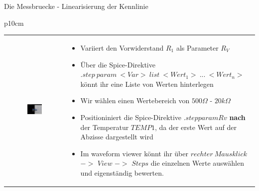 \begin{frame}[t]{Die Messbruecke - Linearisierung der Kennlinie}
\begin{spacing}{0.9}
\begin{tiny}
\begin{table}[h!]
\begin{tabular}{p{10cm} }
\begin{tabular}{p{5cm} p{5cm}}
\begin{minipage}{0.5\textwidth}
                            \begin{figure}
                                \centering
                                \includegraphics[width=0.95\linewidth]{pictures/mb_kty81_steps.png}
                            \end{figure}
                        \end{minipage}
                         &
                        \begin{minipage}{0.5\textwidth}
                            \begin{itemize}
                                \item Variiert den Vorwiderstand $R_1$ als Parameter $R_V$
                                \item Über die Spice-Direktive $.step\ param\ <Var>\ list\ <Wert_1>\ ...\ <Wert_n>$ könnt ihr eine Liste von Werten hinterlegen
                                \item Wir wählen einen Wertebereich von $500\Omega$ - $20k\Omega$
                                \item Positioniniert die Spice-Direktive $.step param Rv$ \textbf{nach} der Temperatur $TEMP1$, da der erste Wert auf der Abzisse dargestellt wird
                                \item Im waveform viewer könnt ihr über $rechter\ Mausklick$ $->$ $View$ $->$ $Steps$ die einzelnen Werte auswählen und eigenständig bewerten.
                            \end{itemize}
                        \end{minipage}
                    \end{tabular}
                    \\\\

\end{tabular}
\end{table}
\end{tiny}
\end{spacing}
\end{frame}
